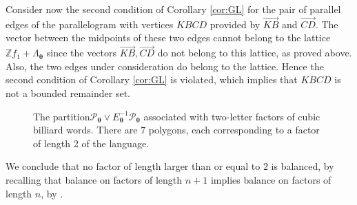 \documentclass{article}
\theoremstyle{definition}
\newcommand{\btheta}{\boldsymbol{\theta}}
\begin{document}
 Consider  now the second condition  of Corollary \ref{cor:GL} for the pair of parallel edges   of  the parallelogram with vertices
 $KBCD$ provided  by  $\overrightarrow{KB }$ and $\overrightarrow{CD}$.
The vector between the midpoints of these two edges  cannot  belong to   the lattice $\mathbb Zf_1+\Lambda_{\btheta}$  since  the vectors $\overrightarrow{KB},\overrightarrow{CD}$  do not belong to this lattice, as proved above.  Also, the two edges under consideration  do  belong   to the lattice. Hence the second condition of  Corollary \ref{cor:GL} is violated, which implies that  $KBCD$ is not a bounded remainder set.


   
\begin{figure}
\caption{The partition${\mathcal P}_{\btheta}\vee E_{\btheta}^{-1} {\mathcal P}_{\btheta}$ associated with two-letter  factors  of cubic billiard 
 words. There are $7$ polygons, each corresponding to a factor  of length  2 of the language.}\label{fig-dim2}
\end{figure}

We conclude  that  no  factor of length larger than or equal to $2$  is balanced,    by recalling that   balance on factors of length $n + 1$ implies   balance on factors of length $n$, 
 by \cite[Lemma 23]{Adam:03}.
\end{document}
